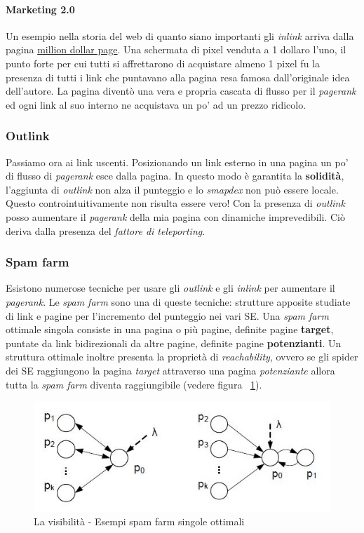 				\paragraph{Marketing 2.0}
					Un esempio nella storia del web di quanto siano importanti gli \emph{inlink} arriva dalla pagina \href{http://www.milliondollarhomepage.com/}{million dollar page}. Una schermata di pixel venduta a 1 dollaro l'uno, il punto forte per cui tutti si affrettarono di acquistare almeno 1 pixel fu la presenza di tutti i link che puntavano alla pagina resa famosa dall'originale idea dell'autore. La pagina diventò una vera e propria cascata di flusso per il \emph{pagerank} ed ogni link al suo interno ne acquistava un po' ad un prezzo ridicolo.
			
			\subsubsection{Outlink}
				Passiamo ora ai link uscenti. Posizionando un link esterno in una pagina un po' di flusso di \emph{pagerank} esce dalla pagina. In questo modo è garantita la \textbf{solidità}, l'aggiunta di \emph{outlink} non alza il punteggio e lo \emph{smapdex} non può essere locale.
				Questo controintuitivamente non risulta essere vero! Con la presenza di \emph{outlink} posso aumentare il \emph{pagerank} della mia pagina con dinamiche imprevedibili. Ciò deriva dalla presenza del \emph{fattore di teleporting}.
			
			\subsubsection{Spam farm}
				Esistono numerose tecniche per usare gli \emph{outlink} e gli \emph{inlink} per aumentare il \emph{pagerank}. Le \emph{spam farm} sono una di queste tecniche: strutture apposite studiate di link e pagine per l'incremento del punteggio nei vari SE. 
				Una \emph{spam farm} ottimale singola consiste in una pagina o più pagine, definite pagine \textbf{target}, puntate da link bidirezionali da altre pagine, definite pagine \textbf{potenzianti}. Un struttura ottimale inoltre presenta la proprietà di \emph{reachability}, ovvero se gli spider dei SE raggiungono la pagina \emph{target} attraverso una pagina \emph{potenziante} allora tutta la \emph{spam farm} diventa raggiungibile (vedere figura ~\ref{fig:LaVisibilita-SpamFarm1}).
				
				\begin{figure} [h]
					\centering
					\includegraphics[scale=0.9]{images/LaVisibilita-SpamFarm1}
					\caption{La visibilità - Esempi spam farm singole ottimali}
					\label{fig:LaVisibilita-SpamFarm1}
				\end{figure}
				
